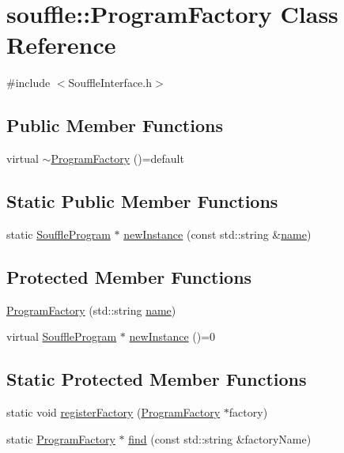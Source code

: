 \hypertarget{classsouffle_1_1_program_factory}{}\section{souffle\+:\+:Program\+Factory Class Reference}
\label{classsouffle_1_1_program_factory}


{\ttfamily \#include $<$Souffle\+Interface.\+h$>$}

\subsection*{Public Member Functions}
\begin{DoxyCompactItemize}
\item 
virtual \hyperlink{classsouffle_1_1_program_factory_ad3b0b3fa4b09a6853e95a61d432229ac}{$\sim$\+Program\+Factory} ()=default
\end{DoxyCompactItemize}
\subsection*{Static Public Member Functions}
\begin{DoxyCompactItemize}
\item 
static \hyperlink{classsouffle_1_1_souffle_program}{Souffle\+Program} $\ast$ \hyperlink{classsouffle_1_1_program_factory_a195f94a860a7fc1ba823074070e10fe2}{new\+Instance} (const std\+::string \&\hyperlink{classsouffle_1_1_program_factory_a9dc30a356790b8543aa5dbf285eca4da}{name})
\end{DoxyCompactItemize}
\subsection*{Protected Member Functions}
\begin{DoxyCompactItemize}
\item 
\hyperlink{classsouffle_1_1_program_factory_a3895c35be3c180fef60ab3ca4311fb72}{Program\+Factory} (std\+::string \hyperlink{classsouffle_1_1_program_factory_a9dc30a356790b8543aa5dbf285eca4da}{name})
\item 
virtual \hyperlink{classsouffle_1_1_souffle_program}{Souffle\+Program} $\ast$ \hyperlink{classsouffle_1_1_program_factory_aeeb8c8fa86018f5f19cf6d419acdec54}{new\+Instance} ()=0
\end{DoxyCompactItemize}
\subsection*{Static Protected Member Functions}
\begin{DoxyCompactItemize}
\item 
static void \hyperlink{classsouffle_1_1_program_factory_a460cdf1db973dad0daba7b936a741826}{register\+Factory} (\hyperlink{classsouffle_1_1_program_factory}{Program\+Factory} $\ast$factory)
\item 
static \hyperlink{classsouffle_1_1_program_factory}{Program\+Factory} $\ast$ \hyperlink{classsouffle_1_1_program_factory_ad2b41c03dbad20406048a9504d89c0c1}{find} (const std\+::string \&factory\+Name)
\end{DoxyCompactItemize}
